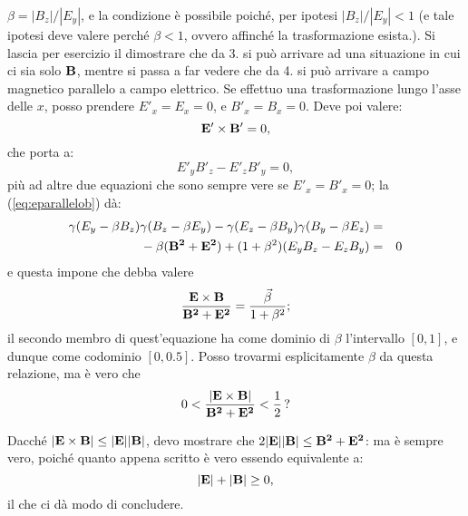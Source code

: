 $\beta = |B_z|/|E_y|$, e la condizione \`e possibile poich\'e, per
ipotesi $|B_z|/|E_y|<1$ (e tale ipotesi deve valere perch\'e
$\beta<1$, ovvero affinch\'e la trasformazione esista.). Si lascia per
esercizio il dimostrare che da 3. si pu\`o arrivare ad una situazione
in cui ci sia solo $\mathbf{B}$, mentre si passa a far vedere che da
4. si pu\`o arrivare a campo magnetico parallelo a campo elettrico. Se
effettuo una trasformazione lungo l'asse delle $x$, posso prendere
$E'_x = E_x = 0$, e $B'_x = B_x = 0$. Deve poi valere:
\begin{displaymath}
\mathbf{E'\times B'}=0,
\end{displaymath}
che porta a:
\begin{equation}
  E'_y B'_z - E'_z B'_y = 0, \label{eq:eparallelob}
\end{equation}
pi\`u ad altre due equazioni che sono sempre vere se $E'_x = B'_x =
0$; la (\ref{eq:eparallelob}) d\`a:
\begin{eqnarray*}
  \gamma (E_y - \beta B_z)\gamma (B_z - \beta E_y) - \gamma (E_z -
  \beta B_y)\gamma (B_y - \beta E_z) & = & \\
  \mbox{} - \beta (\mathbf{B^2 + E^2}) + (1+\beta^2)(E_y B_z - E_z B_y)
  & = & 0
\end{eqnarray*}
e questa impone che debba valere
\begin{equation}
  \frac{\mathbf{E \times B}}{\mathbf{B^2 + E^2}} =
  \frac{\vec{\beta}}{1+\beta^2};
\end{equation}
il secondo membro di quest'equazione ha come dominio di $\beta$
l'intervallo $[0,1]$, e dunque come codominio $[0,0.5]$. Posso
trovarmi esplicitamente $\beta$ da questa relazione, ma \`e vero che
\begin{displaymath}
0 <\frac{|\mathbf{E \times B}|}{\mathbf{B^2 + E^2}}<\frac{1}{2}\,?
\end{displaymath}

Dacch\'e $|\mathbf{E \times B}|\leq |\mathbf{E}||\mathbf{B}|$, devo mostrare
che $2|\mathbf{E}||\mathbf{B}|\leq \mathbf{B^2 + E^2} $: ma \`e sempre vero,
poich\'e quanto appena scritto \`e vero essendo equivalente a:
\begin{displaymath}
\mathbf{|E| + |B|}\geq0,
\end{displaymath}
il che ci d\`a modo di concludere.

